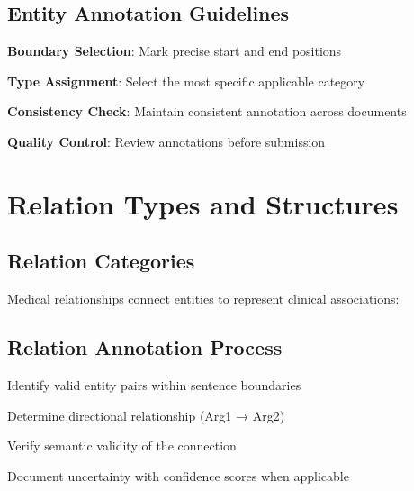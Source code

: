 \documentclass[11pt,a4paper]{article}
\begin{document}
\subsection{Entity Annotation Guidelines}

\begin{steplist}
    \item \textbf{Boundary Selection}: Mark precise start and end positions
    \item \textbf{Type Assignment}: Select the most specific applicable category
    \item \textbf{Consistency Check}: Maintain consistent annotation across documents
    \item \textbf{Quality Control}: Review annotations before submission
\end{steplist}


\section{Relation Types and Structures}

\subsection{Relation Categories}

Medical relationships connect entities to represent clinical associations:

\resetrowcolor
\begin{relationtable}
\end{relationtable}

\subsection{Relation Annotation Process}

\begin{entitylist}
    \item Identify valid entity pairs within sentence boundaries
    \item Determine directional relationship (Arg1 → Arg2)
    \item Verify semantic validity of the connection
    \item Document uncertainty with confidence scores when applicable
\end{entitylist}
\end{document}
